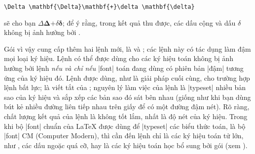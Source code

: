\medskip
\begin{verbatim}
\Delta \mathbf{\Delta}\mathbf{+}\delta \mathbf{\delta}
\end{verbatim}

\medskip\noindent
sẽ cho bạn $\Delta \mathbf{\Delta}\mathbf{+}\delta \mathbf{\delta}$;
để ý rằng, trong kết quả thu được, các dấu cộng và dấu $\delta$ không
bị ảnh hưởng bởi .

\medskip
Gói  vì vậy cung cấp thêm hai lệnh mới, là
 và ; các lệnh này có tác dụng làm đậm mọi loại
ký hiệu. Lệnh  có thể được dùng cho các ký hiệu toán không
bị ảnh hưởng bởi lệnh  \emph{nếu và chỉ nếu} |font| toán
đang dùng có phiên bản |đậm| tương ứng của ký hiệu đó. Lệnh 
được dùng, như là giải pháp cuối cùng, cho trường hợp lệnh 
bất lực;  là viết tắt của ;
nguyên lý làm việc của lệnh  là |typeset| nhiều bản sao của
ký hiệu và sắp xếp các bản sao đó sát bên nhau (giống như khi bạn
dùng bút kẻ nhiều đường liên tiếp nhau trên giấy để có một đường đậm nét).
Rõ ràng, chất lượng kết quả của lệnh  là không tốt lắm, nhất là
độ nét của ký hiệu. Trong khi bộ |font| chuẩn của \LaTeX{} được dùng để
|typeset| các biểu thức toán, là bộ |font| CM (Computer Modern), thì cần đến
lệnh  chỉ là các ký hiệu toán tử lớn, như ,
các dấu ngoặc quá cỡ, hay là các ký hiệu toán học bổ sung bởi gói
 (xem \cite{amsfonts}).

